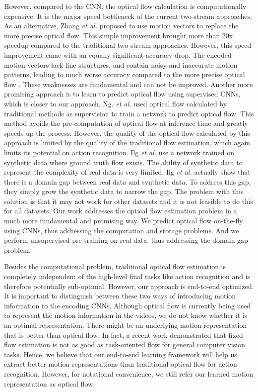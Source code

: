 \documentclass[runningheads]{llncs}
\begin{document}
		However, compared to the CNN, the optical flow calculation is computationally expensive. It is the major speed bottleneck of the current two-stream approaches. As an alternative, Zhang \textit{et al.} \cite{EMV_cvpr16} proposed to use motion vectors to replace the more precise optical flow. This simple improvement brought more than 20x speedup compared to the traditional two-stream approaches. However, this speed improvement came with an equally significant accuracy drop. The encoded motion vectors lack fine structures, and contain noisy and inaccurate motion patterns, leading to much worse accuracy compared to the more precise optical flow \cite{TVL1realTime}. These weaknesses are fundamental and can not be improved. Another more promising approach is to learn to predict optical flow using supervised CNNs, which is closer to our approach. Ng. \textit{et al.} \cite{actionflownet_16} used optical flow calculated by traditional methods as supervision to train a network to predict optical flow. This method avoids the pre-computation of optical flow at inference time and greatly speeds up the process. However, the quality of the optical flow calculated by this approach is limited by the quality of the traditional flow estimation, which again limits its potential on action recognition. Ilg \textit{et al.} \cite{flownet2} use a network trained on synthetic data where ground truth flow exists. The ability of synthetic data to represent the complexity of real data is very limited. Ilg \textit{et al.} \cite{flownet2} actually show that there is a domain gap between real data and synthetic data. To address this gap, they simply grow the synthetic data to narrow the gap. The problem with this solution is that it may not work for other datasets and it is not feasible to do this for all datasets. Our work addresses the optical flow estimation problem in a much more fundamental and promising way. We predict optical flow on-the-fly using CNNs, thus addressing the computation and storage problems. And we perform unsupervised pre-training on real data, thus addressing the domain gap problem. 
		
		Besides the computational problem, traditional optical flow estimation is completely independent of the high-level final tasks like action recognition and is therefore potentially sub-optimal. However, our approach is end-to-end optimized. 
		It is important to distinguish between these two ways of introducing motion information to the encoding CNNs. 
		Although optical flow is currently being used to represent the motion information in the videos, we do not know whether it is an optimal representation. There might be an underlying motion representation that is better than optical flow. In fact, a recent work \cite{xue17toflow} demonstrated that fixed flow estimation is not as good as task-oriented flow for general computer vision tasks. 
		Hence, we believe that our end-to-end learning framework will help us extract better motion representations than traditional optical flow for action recognition. However, for notational convenience, we still refer our learned motion representation as optical flow. 
		
\end{document}
